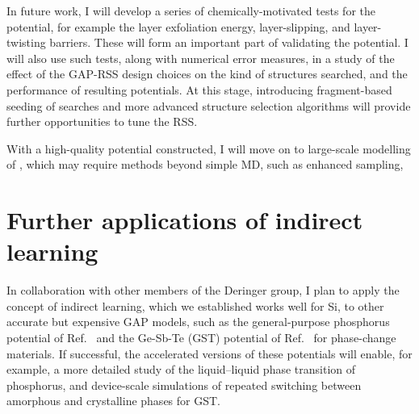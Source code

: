 \documentclass[12pt,a4paper,twoside,nobind]{ociamthesis}
\begin{document}
In future work, I will develop a series of chemically-motivated tests
 for the potential, for example the layer exfoliation energy, layer-slipping, and layer-twisting barriers. 
 These will form an important part of validating the potential. 
 I will also use such tests, along with numerical error measures,
 in a study of the effect of the GAP-RSS design choices on the kind of structures searched, and the performance of resulting potentials. 
 At this stage, introducing fragment-based seeding of searches and more advanced structure selection algorithms will
 provide further opportunities to tune the RSS.

 With a high-quality  potential constructed, I will move on to large-scale modelling of , which may require methods beyond simple MD, such as enhanced sampling, 


\section{Further applications of indirect learning}

In collaboration with other members of the Deringer group, I plan to apply the concept of indirect learning, which we established works well for Si, to other accurate but expensive GAP models, such as the general-purpose phosphorus potential
of Ref.\ \cite{Deringer2020} and the Ge-Sb-Te (GST) potential of Ref.\ \cite{Zhou2022} for phase-change materials. If successful, the accelerated versions of these potentials will enable, for example, a more detailed study of the liquid--liquid phase
transition of phosphorus, and device-scale simulations of repeated switching between amorphous and crystalline phases for GST.


\clearpage
%

\printbibliography

%
\clearpage
\startappendices
\small
\end{document}
